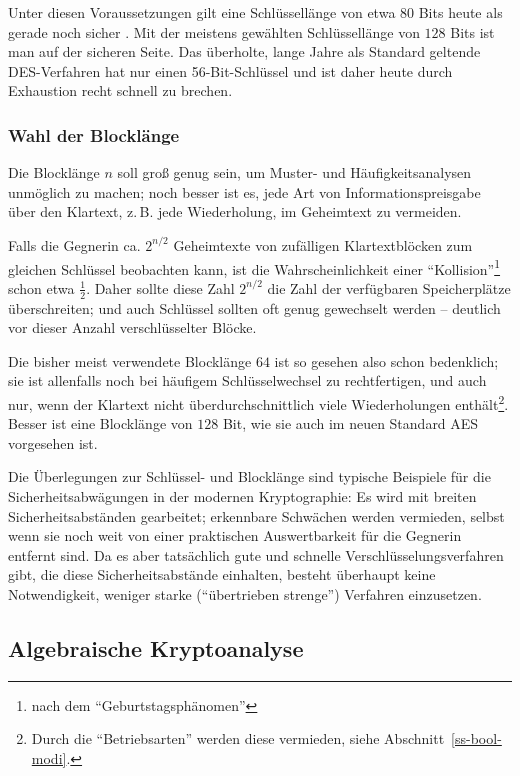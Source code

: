 \begin{refsegment}
Unter diesen Voraussetzungen gilt eine Schlüssellänge von etwa $80$
Bits heute als gerade noch sicher \cite{LeVe2000}. Mit der meistens
gewählten Schlüssellänge von $128$ Bits ist man auf der sicheren Seite.
Das überholte, lange Jahre als Standard geltende DES-Verfahren hat
nur einen 56-Bit-Schlüssel und ist daher heute durch Exhaustion
recht schnell zu brechen.

\subsubsection*{Wahl der Blocklänge}

Die Blocklänge $n$ soll groß genug sein, um Muster- und Häufigkeitsanalysen
unmöglich zu machen; noch besser ist es, jede Art von Informationspreisgabe
über den Klartext, z.\,B. jede Wiederholung, im Geheimtext zu vermeiden.

Falls die Gegnerin ca. $2^{n/2}$ Geheimtexte von zufälligen
Klartextblöcken zum gleichen Schlüssel beobachten kann, ist die
Wahrscheinlichkeit einer
"`Kollision"'\footnote{%
  nach dem "`Geburtstagsphänomen"'
} schon etwa $\frac{1}{2}$.
Daher sollte diese Zahl $2^{n/2}$ die Zahl der verfügbaren
Speicherplätze überschreiten; und auch Schlüssel sollten oft genug gewechselt
werden -- deutlich vor dieser Anzahl verschlüsselter Blöcke.

Die bisher meist verwendete Blocklänge $64$ ist so gesehen also schon bedenklich;
sie ist allenfalls noch bei häufigem Schlüsselwechsel zu rechtfertigen,
und auch nur, wenn der Klartext nicht überdurchschnittlich viele Wiederholungen
enthält\footnote{%
  Durch die "`Betriebsarten"' werden diese vermieden, siehe
  Abschnitt~\ref{ss-bool-modi}.
}. Besser ist eine Blocklänge von $128$ Bit, wie sie auch im neuen
Standard AES vorgesehen ist.

Die Überlegungen zur Schlüssel- und Blocklänge sind typische Beispiele
für die Sicherheitsabwägungen in der
modernen Kryptographie: Es wird mit breiten Sicherheitsabständen gearbeitet;
erkennbare Schwächen werden vermieden, selbst wenn sie noch weit von einer
praktischen Auswertbarkeit für die Gegnerin entfernt sind. Da es
aber tatsächlich gute und schnelle Verschlüsselungsverfahren gibt,
die diese Sicherheitsabstände einhalten, besteht überhaupt keine
Notwendigkeit, weniger starke ("`übertrieben strenge"') Verfahren
einzusetzen.

\subsection{Algebraische Kryptoanalyse}
\label{ss-bool-algca}


\end{refsegment}
